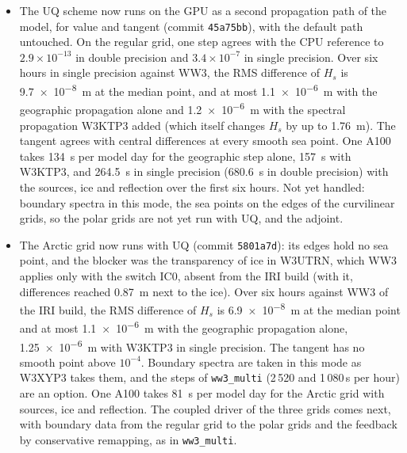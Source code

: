 \documentclass[11pt,a4paper]{article}
\begin{document}
\begin{itemize}
synthetic tests. A Fortran harness calling W3XYP3 of the IRI build for
15 components of the regular grid gives the same counters and maps,
transparencies within $1.2\times10^{-7}$ and fields within
$5.7\times10^{-7}$ of their maximum, in both sweep orders. Against WW3
with the geographic propagation alone over six hours of the regular
grid from the same restart, the RMS difference in time is
\SI{1.4e-7}{m} at the median point and \SI{1.4e-6}{m} at worst (commit
\texttt{0c1cfcf}), once the driver splits each hour into equal steps as
W3WAVE does and takes the wavenumbers of the structured grids
(\texttt{WAVNU1} at $\max(\texttt{DMIN}, \eta - z_b)$); with the earlier
driver some points differed by up to \SI{0.35}{m}.
\item The UQ scheme now runs on the GPU as a second propagation path of
the model, for value and tangent (commit \texttt{45a75bb}), with the
default path untouched. On the regular grid, one step agrees with the
CPU reference to $2.9\times10^{-13}$ in double precision and
$3.4\times10^{-7}$ in single precision. Over six hours in single
precision against WW3, the RMS difference of $H_s$ is \SI{9.7e-8}{m} at
the median point, and at most \SI{1.1e-6}{m} with the geographic
propagation alone and \SI{1.2e-6}{m} with the spectral propagation
W3KTP3 added (which itself changes $H_s$ by up to \SI{1.76}{m}). The
tangent agrees with central differences at every smooth sea point. One
A100 takes \SI{134}{s} per model day for the geographic step alone,
\SI{157}{s} with W3KTP3, and \SI{264.5}{s} in single precision
(\SI{680.6}{s} in double precision) with the sources, ice and
reflection over the first six hours. Not yet handled: boundary spectra
in this mode, the sea points on the edges of the curvilinear grids, so
the polar grids are not yet run with UQ, and the adjoint.
\item The Arctic grid now runs with UQ (commit \texttt{5801a7d}): its
edges hold no sea point, and the blocker was the transparency of ice in
W3UTRN, which WW3 applies only with the switch IC0, absent from the IRI
build (with it, differences reached \SI{0.87}{m} next to the ice). Over
six hours against WW3 of the IRI build, the RMS difference of $H_s$ is
\SI{6.9e-8}{m} at the median point and at most \SI{1.1e-6}{m} with the
geographic propagation alone, \SI{1.25e-6}{m} with W3KTP3 in single
precision. The tangent has no smooth point above $10^{-4}$. Boundary
spectra are taken in this mode as W3XYP3 takes them, and the steps of
\texttt{ww3\_multi} (2\,520 and 1\,080\,s per hour) are an option. One
A100 takes \SI{81}{s} per model day for the Arctic grid with sources,
ice and reflection. The coupled driver of the three grids comes next,
with boundary data from the regular grid to the polar grids and the
feedback by conservative remapping, as in \texttt{ww3\_multi}.
\end{itemize}
\end{document}
